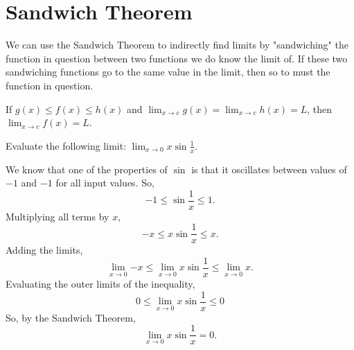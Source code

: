 \section{Sandwich Theorem}
We can use the Sandwich Theorem to indirectly find limits by "sandwiching" the function in question between two functions we do know the limit of.
If these two sandwiching functions go to the same value in the limit, then so to must the function in question.
\begin{theorem}
	If $g(x) \leq f(x) \leq h(x)$ and $\lim_{x \to c}{g(x)} = \lim_{x\to c}{h(x)} = L$, then $\lim_{x \to c}{f(x)} = L$.
\end{theorem}

\begin{example}
	Evaluate the following limit: $\lim_{x \to 0}{x\sin{\frac{1}{x}}}$.
\end{example}
We know that one of the properties of $\sin$ is that it oscillates between values of $-1$ and $-1$ for all input values.
So,
\begin{equation*}
	-1 \leq \sin{\frac{1}{x}} \leq 1.
\end{equation*}
Multiplying all terms by $x$,
\begin{equation*}
	-x \leq x\sin{\frac{1}{x}} \leq x.
\end{equation*}
Adding the limits,
\begin{equation*}
	\lim_{x\to 0}{-x} \leq \lim_{x \to 0}{x\sin{\frac{1}{x}}} \leq \lim_{x \to 0}{x}.
\end{equation*}
Evaluating the outer limits of the inequality,
\begin{equation*}
	0 \leq \lim_{x \to 0}{x\sin{\frac{1}{x}}} \leq 0
\end{equation*}
So, by the Sandwich Theorem,
\begin{equation*}
	\lim_{x \to 0}{x\sin{\frac{1}{x}}} = 0.
\end{equation*}